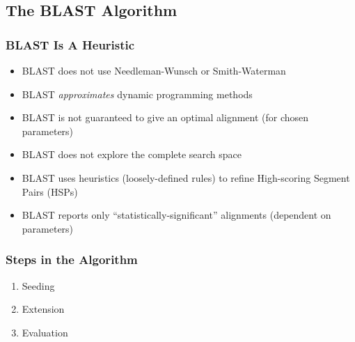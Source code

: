 %

\subsection{The BLAST Algorithm}
\begin{frame}
  \frametitle{BLAST Is A Heuristic}
  \begin{itemize}
    \item<1-> BLAST does not use Needleman-Wunsch or Smith-Waterman
    \item<1-> BLAST \emph{approximates} dynamic programming methods
    \item<1-> BLAST is not guaranteed to give an optimal alignment (for chosen parameters)
    \item<2-> BLAST does not explore the complete search space
    \item<3-> BLAST uses heuristics (loosely-defined rules) to refine High-scoring Segment Pairs (HSPs)
    \item<4-> BLAST reports only ``statistically-significant'' alignments (dependent on parameters)
  \end{itemize}
\end{frame}

\begin{frame}
  \frametitle{Steps in the Algorithm}
  \begin{enumerate}
    \item Seeding
    \item Extension
    \item Evaluation
  \end{enumerate}
\end{frame}
